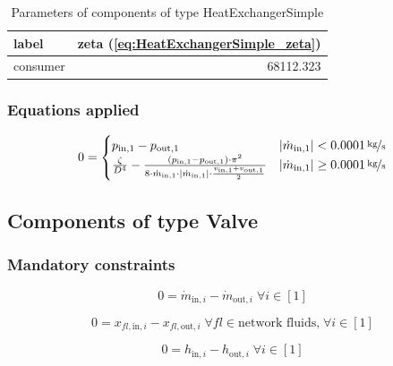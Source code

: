 \begin{table}[H]\begin{center}
\begin{tabular}{lr}
\toprule
    label &  zeta (\ref{eq:HeatExchangerSimple_zeta}) \\
\midrule
 consumer &                                 68112.323 \\
\bottomrule
\end{tabular}
\caption{Parameters of components of type HeatExchangerSimple}
\end{center}\end{table}

\subsubsection{Equations applied}

\begin{equation}
\label{eq:HeatExchangerSimple_zeta}
0 = \begin{cases}
p_\mathrm{in,1}- p_\mathrm{out,1} & |\dot{m}_\mathrm{in,1}| < \unitfrac[0.0001]{kg}{s} \\
\frac{\zeta}{D^4}-\frac{(p_\mathrm{in,1}-p_\mathrm{out,1})\cdot\pi^2}{8\cdot\dot{m}_\mathrm{in,1}\cdot|\dot{m}_\mathrm{in,1}|\cdot\frac{v_\mathrm{in,1} + v_\mathrm{out,1}}{2}}& |\dot{m}_\mathrm{in,1}| \geq \unitfrac[0.0001]{kg}{s}
\end{cases}
\end{equation}


\subsection{Components of type Valve}

\subsubsection{Mandatory constraints}

\begin{equation}
\label{eq:Valve_mass_flow_constraints}
0=\dot{m}_{\mathrm{in,}i}-\dot{m}_{\mathrm{out,}i}\; \forall i \in [1]
\end{equation}

\begin{equation}
\label{eq:Valve_fluid_constraints}
0=x_{fl\mathrm{,in,}i}-x_{fl\mathrm{,out,}i}\;\forall fl \in\text{network fluids,}\; \forall i \in [1]
\end{equation}

\begin{equation}
\label{eq:Valve_enthalpy_equality_constraints}
0=h_{\mathrm{in,}i}-h_{\mathrm{out,}i}\; \forall i \in [1]
\end{equation}


